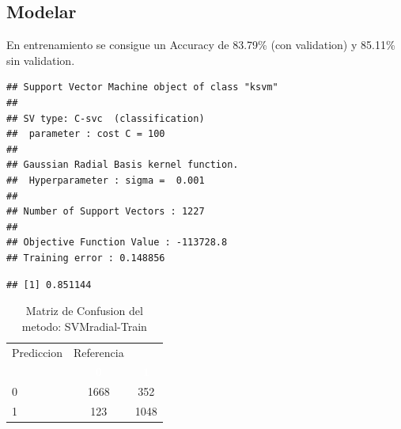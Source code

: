 \documentclass[]{article}
\begin{document}
\hypertarget{modelar-7}{%
\subsection{Modelar}\label{modelar-7}}

En entrenamiento se consigue un Accuracy de 83.79\% (con validation) y
85.11\% sin validation.

\begin{lstlisting}
## Support Vector Machine object of class "ksvm" 
## 
## SV type: C-svc  (classification) 
##  parameter : cost C = 100 
## 
## Gaussian Radial Basis kernel function. 
##  Hyperparameter : sigma =  0.001 
## 
## Number of Support Vectors : 1227 
## 
## Objective Function Value : -113728.8 
## Training error : 0.148856
\end{lstlisting}

\begin{lstlisting}
## [1] 0.851144
\end{lstlisting}

\begin{table}[!h]

\caption{\label{tab:MatrizConf_SVMradial-Train}Matriz de Confusion del metodo: SVMradial-Train }
\centering
\begin{tabular}[t]{lcc}
\toprule
\multicolumn{1}{c}{Prediccion} & \multicolumn{1}{c}{Referencia} & \multicolumn{1}{c}{ } \\
\cmidrule(l{3pt}r{3pt}){1-1} \cmidrule(l{3pt}r{3pt}){2-2}
\rowcolor{black}  \multicolumn{1}{c}{\textcolor{white}{\textbf{ }}} & \multicolumn{1}{c}{\textcolor{white}{\textbf{0}}} & \multicolumn{1}{c}{\textcolor{white}{\textbf{1}}}\\
\midrule
\rowcolor{gray!6}  0 & 1668 & 352\\
1 & 123 & 1048\\
\bottomrule
\end{tabular}
\end{table}
\end{document}
